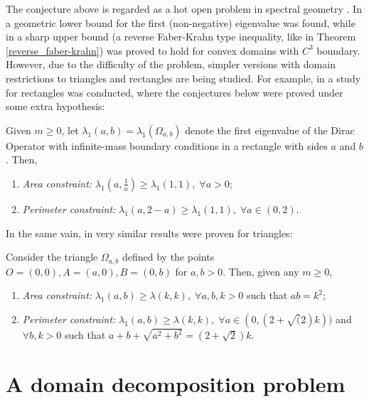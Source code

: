 The conjecture above is regarded as a hot open problem in spectral geometry \cite{krejcirik_larson_lotoreichik_2019}. In \cite{benguria2017spectral} a geometric lower bound for the first (non-negative) eigenvalue was found, while in \cite{lotoreichik2019sharp} a sharp upper bound (a reverse Faber-Krahn type inequality, like in Theorem \ref*{reverse_faber-krahn}) was proved to hold for convex domains with \(C^3\) boundary. However, due to the difficulty of the problem, simpler versions with domain restrictions to triangles and rectangles are being studied. For example, in \cite{briet2022spectral} a study for rectangles was conducted, where the conjectures below were proved under some extra hypothesis:
\begin{conjecture}\label{david_conjectures}
    Given \(m \geq 0\), let \(\lambda_1(a, b) = \lambda_1(\Omega_{a, b})\) denote the first eigenvalue of the Dirac Operator with infinite-mass boundary conditions in a rectangle with sides \(a\) and \(b\). Then,
    \begin{enumerate}
        \item \textit{Area constraint: } \(\lambda_1(a, \frac{1}{a}) \geq \lambda_1(1, 1), \; \forall a>0 \);
        \item \textit{Perimeter constraint: } \(\lambda_1(a, 2-a) \geq \lambda_1(1, 1), \; \forall a\in (0, 2)\).
    \end{enumerate}
\end{conjecture}
In the same vain, in \cite{vu2023spectral} very similar results were proven for triangles:
\begin{conjecture}\label{triangle_conjectures}
    Consider the triangle \(\Omega_{a, b}\) defined by the points \(O=(0, 0), A=(a, 0), B=(0, b)\) for \(a, b>0\). Then, given any \(m \geq 0\),
    \begin{enumerate}
        \item \textit{Area constraint: } \(\lambda_1(a, b) \geq \lambda(k, k),\; \forall a, b, k >0\) such that \(ab=k^2\);
        \item \textit{Perimeter constraint: } \(\lambda_1(a, b) \geq \lambda(k, k),\; \forall a \in (0, (2+\sqrt(2)k))\) and \(\forall b, k > 0\) such that \(a+b+\sqrt{a^2+b^2}=(2+\sqrt{2})k\).
    \end{enumerate}
\end{conjecture}

\section{A domain decomposition problem}\label{domain_decomp_problem}

